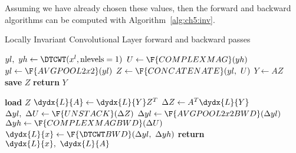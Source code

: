 Assuming we have already chosen these values, 
then the forward and backward algorithms can be computed with
Algorithm~\autoref{alg:ch5:inv}.

\begin{algorithm}[t]
\caption{Locally Invariant Convolutional Layer forward and backward
passes}\label{alg:ch5:inv}
\begin{algorithmic}[1]
  \State $yl,\ yh \gets \DTCWT(x^l, \mbox{nlevels}=1) $ 
  \State $U \gets \F{COMPLEXMAG}(yh)$
  \State $yl \gets \F{AVGPOOL2x2}(yl)$  
  \State $Z \gets \F{CONCATENATE}(yl,\ U)$ 
  \State $Y \gets AZ$ 
  \State \textbf{save} $Z$ 
  \State \textbf{return} $Y$ 
\EndProcedure
\end{algorithmic}\vspace{10pt}
\begin{algorithmic}[1]
  \State \textbf{load} $Z$
  \State $\dydx{L}{A} \gets \dydx{L}{Y} Z^T$ 
  \State $\Delta{Z} \gets A^T\dydx{L}{Y}$
  \State $\Delta yl,\ \Delta U \gets \F{UNSTACK}(\Delta Z)$ 
  \State $\Delta yl \gets \F{AVGPOOL2x2BWD}(\Delta yl)$
  \State $\Delta yh \gets \F{COMPLEXMAGBWD}(\Delta U)$
  \State $\dydx{L}{x} \gets \F{\DTCWT BWD}(\Delta yl,\ \Delta yh)$ 
  \State \textbf{return} $\dydx{L}{x},\ \dydx{L}{A}$
\EndProcedure
\end{algorithmic}
\end{algorithm}
